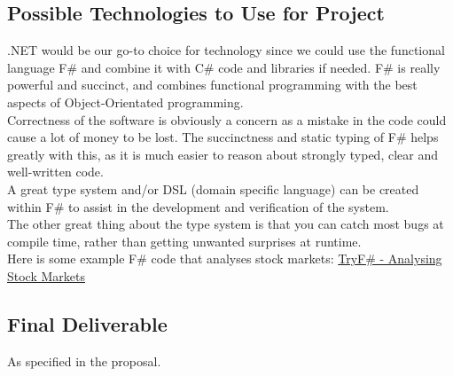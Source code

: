 \documentclass{article}
\begin{document}
	\subsection{Possible Technologies to Use for Project}
	.NET would be our go-to choice for technology since we could use the functional language F\# and combine it with C\# code and libraries if needed. F\# is really powerful and succinct, and combines functional programming with the best aspects of Object-Orientated programming. \\

	Correctness of the software is obviously a concern as a mistake in the code could cause a lot of money to be lost. The succinctness and static typing of F\# helps greatly with this, as it is much easier to reason about strongly typed, clear and well-written code.\\

	A great type system and/or DSL (domain specific language) can be created within F\# to assist in the development and verification of the system.\\

	The other great thing about the type system is that you can catch most bugs at compile time, rather than getting unwanted surprises at runtime. \\

	Here is some example F\# code that analyses stock markets: \href{http://www.tryfsharp.org/Learn/financial-computing#analyzing-stock-markets}{TryF\# - Analysing Stock Markets}

	\subsection{Final Deliverable}
	As specified in the proposal.
\end{document}
